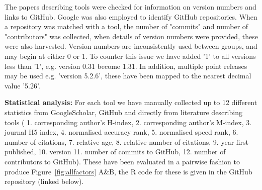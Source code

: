 \documentclass[fleqn,10pt]{SelfArx} %
\begin{document}
The papers describing tools were checked for information on version numbers and links to GitHub. 
Google was also employed to identify GitHub repositories. When a repository was matched with a tool, the number of "commits" and number of "contributors" was collected, when details of version numbers were provided, these were also harvested. 
Version numbers are inconsistently used between groups, and may begin at either 0 or 1. To counter this issue we have added '1' to all versions less than '1', e.g. version 0.31 become 1.31. In addition, multiple point releases may be used e.g. 'version 5.2.6', these have been mapped to the nearest decimal value '5.26'.

\textbf{Statistical analysis:} For each tool we have manually collected up to 12 different
statistics from GoogleScholar, GitHub and directly from literature describing tools (
1. corresponding author’s H-index, 
2. corresponding author’s M-index, 
3. journal H5 index, 
4. normalised accuracy rank, 
5. normalised speed rank, 
6. number of citations, 
7. relative age, 
8. relative number of citations, 
9. year first published, 
10. version
11. number of commits to GitHub,
12. number of contributors to GitHub). 
These have been evaluated in a pairwise fashion to
produce Figure~\ref{fig:allfactors} A\&B, the R code for these is
given in the GitHub repository (linked below).

%
%
\end{document}
